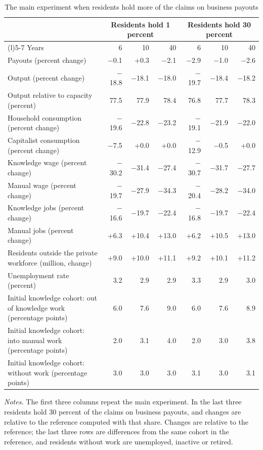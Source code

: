 \begin{table}[htbp]\centering\small
\caption{The main experiment when residents hold more of the claims on business payouts}\label{tab:ownership}
\begin{tabularx}{\linewidth}{@{}>{\raggedright\arraybackslash}Xrrrrrr@{}}\toprule
 & \multicolumn{3}{c}{Residents hold 1 percent} & \multicolumn{3}{c}{Residents hold 30 percent} \\\cmidrule(lr){2-4}\cmidrule(l){5-7}
Years & 6 & 10 & 40 & 6 & 10 & 40 \\
\midrule Payouts (percent change) & $-$0.1 & +0.3 & $-$2.1 & $-$2.9 & $-$1.0 & $-$2.6 \\
Output (percent change) & $-$18.8 & $-$18.1 & $-$18.0 & $-$19.7 & $-$18.4 & $-$18.2 \\
Output relative to capacity (percent) & 77.5 & 77.9 & 78.4 & 76.8 & 77.7 & 78.3 \\
Household consumption (percent change) & $-$19.6 & $-$22.8 & $-$23.2 & $-$19.1 & $-$21.9 & $-$22.0 \\
Capitalist consumption (percent change) & $-$7.5 & +0.0 & +0.0 & $-$12.9 & $-$0.5 & +0.0 \\
Knowledge wage (percent change) & $-$30.2 & $-$31.4 & $-$27.4 & $-$30.7 & $-$31.7 & $-$27.7 \\
Manual wage (percent change) & $-$19.7 & $-$27.9 & $-$34.3 & $-$20.4 & $-$28.2 & $-$34.0 \\
Knowledge jobs (percent change) & $-$16.6 & $-$19.7 & $-$22.4 & $-$16.8 & $-$19.7 & $-$22.4 \\
Manual jobs (percent change) & +6.3 & +10.4 & +13.0 & +6.2 & +10.5 & +13.0 \\
Residents outside the private workforce (million, change) & +9.0 & +10.0 & +11.1 & +9.2 & +10.1 & +11.2 \\
Unemployment rate (percent) & 3.2 & 2.9 & 2.9 & 3.3 & 2.9 & 3.0 \\
Initial knowledge cohort: out of knowledge work (percentage points) & 6.0 & 7.6 & 9.0 & 6.0 & 7.6 & 8.9 \\
Initial knowledge cohort: into manual work (percentage points) & 2.0 & 3.1 & 4.0 & 2.0 & 3.0 & 3.8 \\
Initial knowledge cohort: without work (percentage points) & 3.0 & 3.0 & 3.0 & 3.1 & 3.0 & 3.1 \\
\bottomrule\end{tabularx}
\par\smallskip\begin{minipage}{\linewidth}\footnotesize\emph{Notes.} The first three columns repeat the main experiment. In the last three residents hold 30 percent of the claims on business payouts, and changes are relative to the reference computed with that share. Changes are relative to the reference; the last three rows are differences from the same cohort in the reference, and residents without work are unemployed, inactive or retired.\end{minipage}
\end{table}
